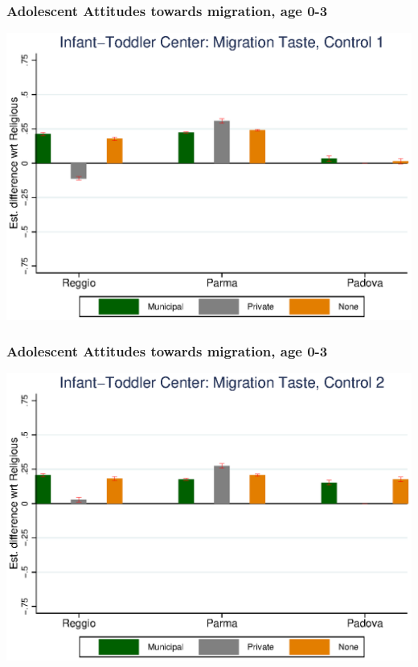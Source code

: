 \documentclass{beamer}
\begin{document}
\begin{frame}\frametitle{Adolescent Attitudes towards migration, age 0-3}
\center
\includegraphics[scale=0.7]{../Output/graphs/M_Asilo_Adol_main.eps}
\end{frame}

\begin{frame}\frametitle{Adolescent Attitudes towards migration, age 0-3}
\center
\includegraphics[scale=0.7]{../Output/graphs/M_Asilo_Adol_inter.eps}
\end{frame}
\end{document}
